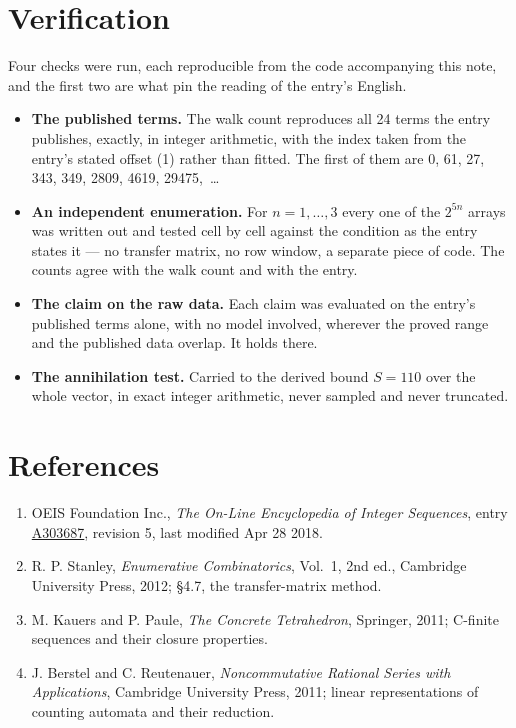 \documentclass[11pt]{article}
\theoremstyle{definition}
\begin{document}
\section{Verification}

Four checks were run, each reproducible from the code accompanying this note, and the first two are what pin the reading of the entry's English.

\begin{itemize}

\item {\bfseries The published terms.} The walk count reproduces all 24 terms the entry publishes, exactly, in integer arithmetic, with the index taken from the entry's stated offset (1) rather than fitted. The first of them are 0, 61, 27, 343, 349, 2809, 4619, 29475,~\dots

\item {\bfseries An independent enumeration.} For $n = 1,\dots,3$ every one of the $2^{5n}$ arrays was written out and tested cell by cell against the condition as the entry states it --- no transfer matrix, no row window, a separate piece of code. The counts agree with the walk count and with the entry.

\item {\bfseries The claim on the raw data.} Each claim was evaluated on the entry's published terms alone, with no model involved, wherever the proved range and the published data overlap. It holds there.

\item {\bfseries The annihilation test.} Carried to the derived bound $S = 110$ over the whole vector, in exact integer arithmetic, never sampled and never truncated.

\end{itemize}

\section{References}

\begin{enumerate}

\item OEIS Foundation Inc., \emph{The On-Line Encyclopedia of Integer Sequences}, entry \href{https://oeis.org/A303687}{A303687}, revision 5, last modified Apr 28 2018.

\item R. P. Stanley, \emph{Enumerative Combinatorics}, Vol.~1, 2nd ed., Cambridge University Press, 2012; \S4.7, the transfer-matrix method.

\item M. Kauers and P. Paule, \emph{The Concrete Tetrahedron}, Springer, 2011; C-finite sequences and their closure properties.

\item J. Berstel and C. Reutenauer, \emph{Noncommutative Rational Series with Applications}, Cambridge University Press, 2011; linear representations of counting automata and their reduction.

\end{enumerate}
\end{document}
